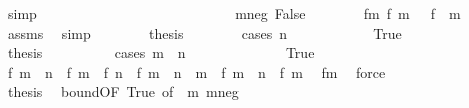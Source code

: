 \begin{isabellebody}
\ simp\isanewline
\ \ \ \ \ \ \ \ \isamarkupfalse%
\isanewline
\ \ \ \ \ \ \isamarkupfalse%
\isanewline
\ \ \ \ \isamarkupfalse%
\isanewline
\ \ \ \ \ \ \isamarkupfalse%
\ m{\isacharunderscore}{\kern0pt}neg{\isacharcolon}{\kern0pt}\ False\isanewline
\ \ \ \ \ \ \isamarkupfalse%
\ f{\isacharunderscore}{\kern0pt}m{\isacharcolon}{\kern0pt}\ {\isachardoublequoteopen}f\ m\ {\isacharequal}{\kern0pt}\ {\isacharminus}{\kern0pt}\ f\ {\isacharparenleft}{\kern0pt}{\isacharminus}{\kern0pt}\ m{\isacharparenright}{\kern0pt}{\isachardoublequoteclose}\ \isamarkupfalse%
\ assms\ \isamarkupfalse%
\ simp\isanewline
\ \ \ \ \ \ \isamarkupfalse%
\ {\isacharquery}{\kern0pt}thesis\isanewline
\ \ \ \ \ \ \isamarkupfalse%
\ {\isacharparenleft}{\kern0pt}cases\ {\isachardoublequoteopen}n\ {\isasymge}\ {}{\isachardoublequoteclose}{\isacharparenright}{\kern0pt}\isanewline
\ \ \ \ \ \ \ \ \isamarkupfalse%
\ True\isanewline
\ \ \ \ \ \ \ \ \isamarkupfalse%
\ {\isacharquery}{\kern0pt}thesis\isanewline
\ \ \ \ \ \ \ \ \isamarkupfalse%
\ {\isacharparenleft}{\kern0pt}cases\ {\isachardoublequoteopen}m\ {\isacharplus}{\kern0pt}\ n\ {\isasymge}\ {}{\isachardoublequoteclose}{\isacharparenright}{\kern0pt}\isanewline
\ \ \ \ \ \ \ \ \ \ \isamarkupfalse%
\ True\isanewline
\ \ \ \ \ \ \ \ \ \ \isamarkupfalse%
\ {\isachardoublequoteopen}{\isasymbar}f\ {\isacharparenleft}{\kern0pt}m\ {\isacharplus}{\kern0pt}\ n{\isacharparenright}{\kern0pt}\ {\isacharminus}{\kern0pt}\ {\isacharparenleft}{\kern0pt}f\ m\ {\isacharplus}{\kern0pt}\ f\ n{\isacharparenright}{\kern0pt}{\isasymbar}\ {\isacharequal}{\kern0pt}\ {\isasymbar}f\ {\isacharparenleft}{\kern0pt}m\ {\isacharplus}{\kern0pt}\ n\ {\isacharplus}{\kern0pt}\ {\isacharminus}{\kern0pt}m{\isacharparenright}{\kern0pt}\ {\isacharminus}{\kern0pt}\ {\isacharparenleft}{\kern0pt}f\ {\isacharparenleft}{\kern0pt}m\ {\isacharplus}{\kern0pt}\ n{\isacharparenright}{\kern0pt}\ {\isacharplus}{\kern0pt}\ f\ {\isacharparenleft}{\kern0pt}{\isacharminus}{\kern0pt}m{\isacharparenright}{\kern0pt}{\isacharparenright}{\kern0pt}{\isasymbar}{\isachardoublequoteclose}\ \isamarkupfalse%
\ f{\isacharunderscore}{\kern0pt}m\ \isamarkupfalse%
\ force\isanewline
\ \ \ \ \ \ \ \ \ \ \isamarkupfalse%
\ {\isacharquery}{\kern0pt}thesis\ \isamarkupfalse%
\ bound{\isacharbrackleft}{\kern0pt}OF\ True{\isacharcomma}{\kern0pt}\ of\ {\isachardoublequoteopen}{\isacharminus}{\kern0pt}\ m{\isachardoublequoteclose}{\isacharbrackright}{\kern0pt}\ m{\isacharunderscore}{\kern0pt}neg\ \isamarkupfalse%

\end{isabellebody}
